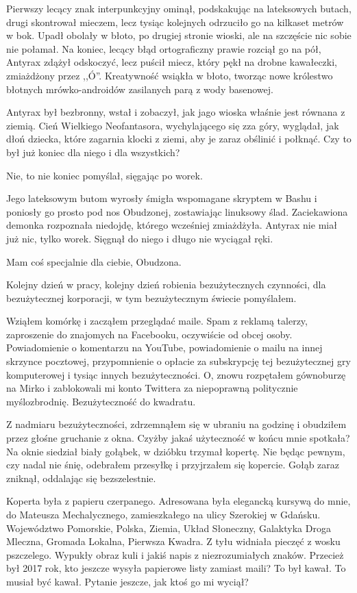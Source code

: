 Pierwszy lecący znak interpunkcyjny ominął, podskakując na lateksowych butach, drugi skontrował mieczem, lecz tysiąc kolejnych odrzuciło go na kilkaset metrów w bok.
Upadł obolały w błoto, po drugiej stronie wioski, ale na szczęście nic sobie nie połamał.
Na koniec, lecący błąd ortograficzny prawie rozciął go na pół, Antyrax zdążył odskoczyć, lecz puścił miecz, który pękł na drobne kawałeczki, zmiażdżony przez ,,Ó''.
Kreatywność wsiąkła w błoto, tworząc nowe królestwo błotnych mrówko-androidów zasilanych parą z wody basenowej.

Antyrax był bezbronny, wstał i zobaczył, jak jago wioska właśnie jest równana z ziemią.
Cień Wielkiego Neofantasora, wychylającego się zza góry, wyglądał, jak dłoń dziecka, które zagarnia klocki z ziemi, aby je zaraz obślinić i połknąć.
Czy to był już koniec dla niego i dla wszystkich?

\ds{} Nie, to nie koniec \dm{} pomyślał, sięgając po worek. \de{}

Jego lateksowym butom wyrosły śmigła wspomagane skryptem w Bashu i poniosły go prosto pod nos Obudzonej, zostawiając linuksowy ślad.
Zaciekawiona demonka rozpoznała niedojdę, którego wcześniej zmiażdżyła.
Antyrax nie miał już nic, tylko worek. Sięgnął do niego i długo nie wyciągał ręki.

\ds{} Mam coś specjalnie dla ciebie, Obudzona. \de{}

\divider{}

\ds{} Kolejny dzień w pracy, kolejny dzień robienia bezużytecznych czynności, dla bezużytecznej korporacji, w tym bezużytecznym świecie \dm{} pomyślałem. \de{}

Wziąłem komórkę i zacząłem przeglądać maile.
Spam z reklamą talerzy, zaproszenie do znajomych na Facebooku, oczywiście od obcej osoby. Powiadomienie o komentarzu na YouTube,
powiadomienie o mailu na innej skrzynce pocztowej, przypomnienie o opłacie za subskrypcję tej bezużytecznej gry komputerowej i tysiąc innych bezużyteczności.
O, znowu rozpętałem gównoburzę na Mirko i zablokowali mi konto Twittera za niepoprawną politycznie myślozbrodnię.
Bezużyteczność do kwadratu.

Z nadmiaru bezużyteczności, zdrzemnąłem się w ubraniu na godzinę i obudziłem przez głośne gruchanie z okna.
Czyżby jakaś użyteczność w końcu mnie spotkała?
Na oknie siedział biały gołąbek, w dzióbku trzymał kopertę.
Nie będąc pewnym, czy nadal nie śnię, odebrałem przesyłkę i przyjrzałem się kopercie.
Gołąb zaraz zniknął, oddalając się bezszelestnie.

Koperta była z papieru czerpanego.
Adresowana była elegancką kursywą do mnie, do Mateusza Mechalycznego, zamieszkałego na ulicy Szerokiej w Gdańsku.
Województwo Pomorskie, Polska, Ziemia, Układ Słoneczny, Galaktyka Droga Mleczna, Gromada Lokalna, Pierwsza Kwadra.
Z tyłu widniała pieczęć z wosku pszczelego.
Wypukły obraz kuli i jakiś napis z niezrozumiałych znaków.
Przecież był 2017 rok, kto jeszcze wysyła papierowe listy zamiast maili?
To był kawał. To musiał być kawał. Pytanie jeszcze, jak ktoś go mi wyciął?

